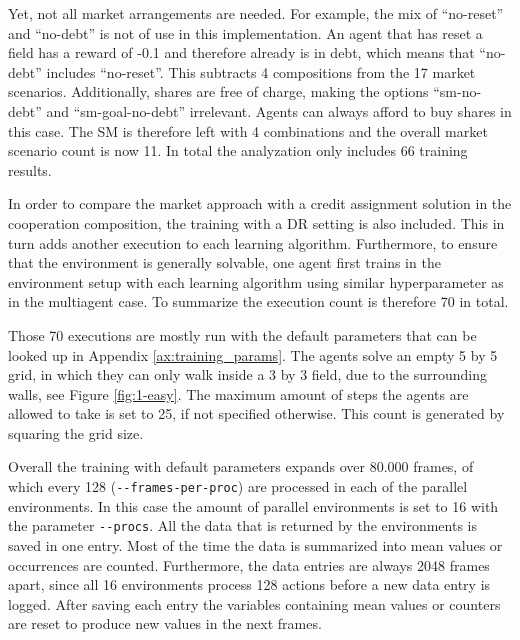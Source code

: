 Yet, not all market arrangements are needed. For example, the mix of ``no-reset'' and ``no-debt'' is not of use in this implementation. An agent that has reset a field has a reward of -0.1 and therefore already is in debt, which means that ``no-debt'' includes ``no-reset''. This subtracts 4 compositions from the 17 market scenarios. Additionally, shares are free of charge, making the options ``sm-no-debt'' and ``sm-goal-no-debt'' irrelevant. Agents can always afford to buy shares in this case. The SM is therefore left with 4 combinations and the overall market scenario count is now 11. In total the analyzation only includes 66 training results. 

In order to compare the market approach with a credit assignment solution in the cooperation composition, the training with a DR setting is also included. This in turn adds another execution to each learning algorithm. Furthermore, to ensure that the environment is generally solvable, one agent first trains in the environment setup with each learning algorithm using similar hyperparameter as in the multiagent case. To summarize the execution count is therefore 70 in total.

Those 70 executions are mostly run with the default parameters that can be looked up in Appendix \ref{ax:training_params}. The agents solve an empty 5 by 5 grid, in which they can only walk inside a 3 by 3 field, due to the surrounding walls, see Figure \ref{fig:1-easy}. The maximum amount of steps the agents are allowed to take is set to 25, if not specified otherwise. This count is generated by squaring the grid size.

Overall the training with default parameters expands over 80.000 frames, of which every 128 (\verb|--frames-per-proc|) are processed in each of the parallel environments. In this case the amount of parallel environments is set to 16 with the parameter \verb|--procs|. All the data that is returned by the environments is saved in one entry. Most of the time the data is summarized into mean values or occurrences are counted. Furthermore, the data entries are always 2048 frames apart, since all 16 environments process 128 actions before a new data entry is logged. After saving each entry the variables containing mean values or counters are reset to produce new values in the next frames. \\\\


